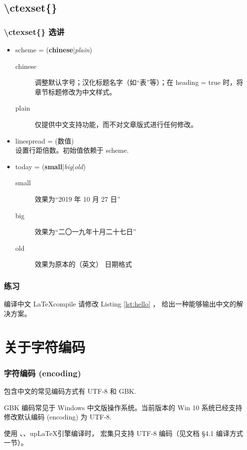 \documentclass[final,aspectratio=32]{ctexbeamer}
\begin{document}
\subsection{\textbackslash ctexset\{\}}
\begin{frame}
\frametitle{\textbackslash ctexset\{\} 选讲}
\begin{itemize}
  \item scheme = (\textbf{chinese}|\emph{plain})
  \begin{description}
    \item[chinese] 调整默认字号；汉化标题名字（如“表”等）；在 heading = true 时，将章节标题修改为中文样式。
    \item[plain] 仅提供中文支持功能，而不对文章版式进行任何修改。
  \end{description}
\item linespread = (数值)\\
设置行距倍数。初始值依赖于 scheme.
\item today = (\textbf{small}|\emph{big}|\emph{old})
\begin{description}
  \item[small] 效果为“2019 年 10 月 27 日”
  \item[big] 效果为“二〇一九年十月二十七日”
  \item[old] 效果为原本的（英文） 日期格式 
\end{description}
\end{itemize}
\end{frame}

\begin{frame}
\frametitle{练习}
\begin{Ex}{编译中文 \LaTeX}{compile}
请修改 Listing \ref{lst:hello} ， 给出一种能够输出中文的解决方案。
\end{Ex}
\end{frame}

\section{关于字符编码}
\begin{frame}
\frametitle{字符编码 (encoding)}
包含中文的常见编码方式有 UTF-8 和 GBK.

GBK 编码常见于 Windows 中文版操作系统。当前版本的 Win 10 系统已经支持修改默认编码 (encoding) 为 UTF-8.

使用 、、up\LaTeX 引擎编译时， \CTeX 宏集只支持 UTF-8 编码（见文档 \cite{ctex} \S 4.1 编译方式一节）。
\end{frame}
\end{document}
